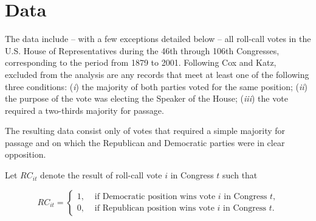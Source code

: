 \section{Data}
\label{ckdata}

The data include -- with a few exceptions detailed below -- all roll-call votes in the U.S. House of Representatives during the 46th through 106th Congresses, corresponding to the period from 1879 to 2001.  Following Cox and Katz, excluded from the analysis are any records that meet at least one of the following three conditions: ({\it i}) the majority of both parties voted for the same position; ({\it ii}) the purpose of the vote was electing the Speaker of the House; ({\it iii}) the vote required a two-thirds majority for passage.

The resulting data consist only of votes that required a simple majority for passage and on which the Republican and Democratic parties were in clear opposition. 

Let $RC_{it}$ denote the result of roll-call vote $i$ in Congress $t$ such that 

\begin{equation*}
RC_{it} =
\begin{cases} 
1, & \text{ if Democratic position wins vote $i$ in Congress $t$,} \\
0, & \text{ if Republican position wins vote $i$ in Congress $t$.}
\end{cases}
\end{equation*}


